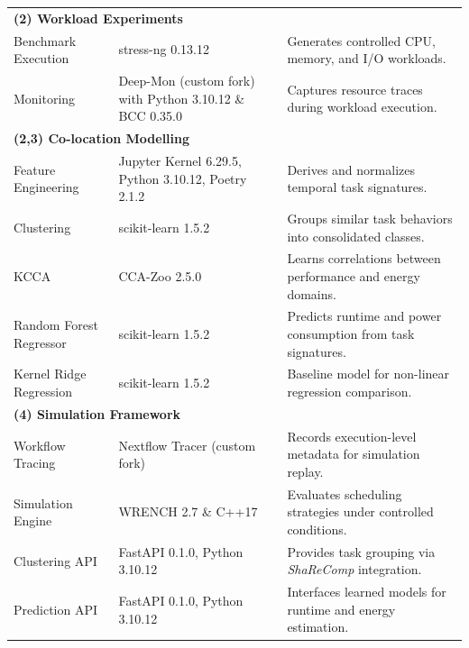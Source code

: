 \begin{table}[H]
{\begin{tabular}{
            p{4.5cm}
            >{\centering\arraybackslash}p{2.8cm}
            p{8.2cm}
            }
            \midrule
            \multicolumn{3}{l}{\textbf{(2) Workload Experiments}}                                                                                                    \\[3pt]
            Benchmark Execution         & stress-ng 0.13.12                                        & Generates controlled CPU, memory, and I/O workloads.            \\
            Monitoring                  & Deep-Mon (custom fork) with Python 3.10.12 \& BCC 0.35.0 & Captures resource traces during workload execution.             \\

            \midrule
            \multicolumn{3}{l}{\textbf{(2,3) Co-location Modelling}}                                                                                                 \\[3pt]
            Feature Engineering         & Jupyter Kernel 6.29.5, Python 3.10.12, Poetry 2.1.2      & Derives and normalizes temporal task signatures.                \\
            Clustering                  & scikit-learn 1.5.2                                       & Groups similar task behaviors into consolidated classes.        \\
            KCCA                        & CCA-Zoo 2.5.0                                            & Learns correlations between performance and energy domains.     \\
            Random Forest Regressor     & scikit-learn 1.5.2                                       & Predicts runtime and power consumption from task signatures.    \\
            Kernel Ridge Regression     & scikit-learn 1.5.2                                       & Baseline model for non-linear regression comparison.            \\

            \midrule
            \multicolumn{3}{l}{\textbf{(4) Simulation Framework}}                                                                                                    \\[3pt]
            Workflow Tracing            & Nextflow Tracer (custom fork)                            & Records execution-level metadata for simulation replay.         \\
            Simulation Engine           & WRENCH 2.7 \& C++17                                      & Evaluates scheduling strategies under controlled conditions.    \\
            Clustering API              & FastAPI 0.1.0, Python 3.10.12                            & Provides task grouping via \textit{ShaReComp} integration.      \\
            Prediction API              & FastAPI 0.1.0, Python 3.10.12                            & Interfaces learned models for runtime and energy estimation.    \\


\end{tabular}}
\end{table}
